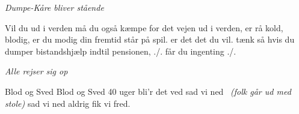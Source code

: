 \documentclass{article}
\begin{document}
\begin{song}
{\em Dumpe-Kåre bliver stående}

 Vil du ud i verden
                må du også kæmpe for det
                vejen ud i verden, er
                rå kold, blodig, er du modig
                din fremtid står på spil.
                er det det du vil.
                tænk så hvis du dumper
                bistandshjælp indtil pensionen,
                ./. får du ingenting ./.

{\em Alle rejser sig op}

    Blod og Sved
                Blod og Sved
                40 uger bli'r det ved
                sad vi ned \ {\small\em (folk går ud med stole)}
                sad vi ned
                aldrig fik vi fred.

\end{song}
\end{document}
